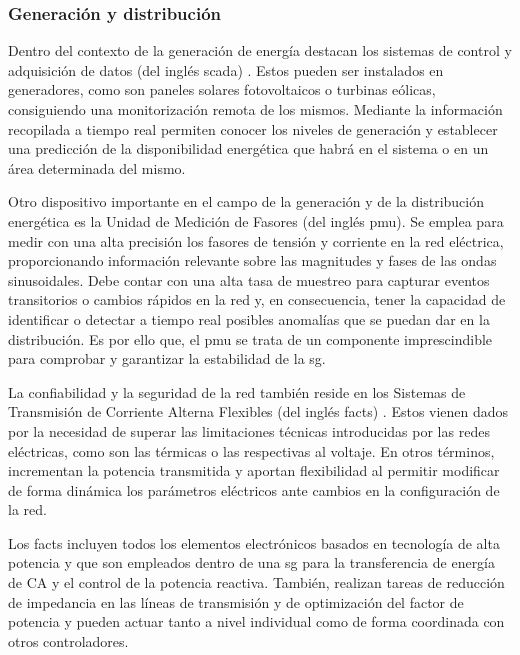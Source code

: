 \subsubsection{Generación y distribución}

\vspace{3mm}

Dentro del contexto de la generación de energía destacan los sistemas de control y adquisición de datos (del inglés \gls{scada}) \cite{scada}. Estos pueden ser instalados en generadores, como son paneles solares fotovoltaicos o turbinas eólicas, consiguiendo una monitorización remota de los mismos. Mediante la información recopilada a tiempo real permiten conocer los niveles de generación y establecer una predicción de la disponibilidad energética que habrá en el sistema o en un área determinada del mismo.

\vspace{3mm}

Otro dispositivo importante en el campo de la generación y de la distribución energética es la Unidad de Medición de Fasores (del inglés \gls{pmu}). Se emplea para medir con una alta precisión los fasores de tensión y corriente en la red eléctrica, proporcionando información relevante sobre las magnitudes y fases de las ondas sinusoidales. Debe contar con una alta tasa de muestreo para capturar eventos transitorios o cambios rápidos en la red y, en consecuencia, tener la capacidad de identificar o detectar a tiempo real posibles anomalías que se puedan dar en la distribución. Es por ello que, el \gls{pmu} se trata de un componente imprescindible para comprobar y garantizar la estabilidad de la \gls{sg}. %

\vspace{3mm}

La confiabilidad y la seguridad de la red también reside en los Sistemas de Transmisión de Corriente Alterna Flexibles (del inglés \gls{facts}) \cite{facts} \cite{facts3}. Estos vienen dados por la necesidad de superar las limitaciones técnicas introducidas por las redes eléctricas, como son las térmicas o las respectivas al voltaje. En otros términos, incrementan la potencia transmitida y aportan flexibilidad al permitir modificar de forma dinámica los parámetros eléctricos ante cambios en la configuración de la red. 

\vspace{3mm}

Los \gls{facts} incluyen todos los elementos electrónicos basados en tecnología de alta potencia y que son empleados dentro de una \gls{sg} para la transferencia de energía de CA y el control de la potencia reactiva. También, realizan tareas de reducción de impedancia en las líneas de transmisión y de optimización del factor de potencia y pueden actuar tanto a nivel individual como de forma coordinada con otros controladores.

